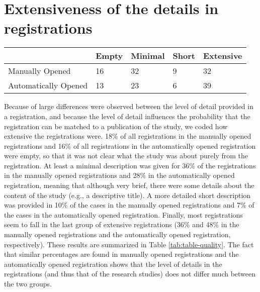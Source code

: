 \documentclass[
  ,jou, a4paper,floatsintext]{apa6}
\begin{document}
\hypertarget{extensiveness-of-the-details-in-registrations}{%
\section{Extensiveness of the details in registrations}\label{extensiveness-of-the-details-in-registrations}}

\begin{table*}[tbp]

\begin{center}
\begin{threeparttable}

\caption{\label{tab:table-quality}Classification of the extensiveness of registrations.}

\begin{tabular}{lllll}
\toprule
 & \multicolumn{1}{c}{Empty} & \multicolumn{1}{c}{Minimal} & \multicolumn{1}{c}{Short} & \multicolumn{1}{c}{Extensive}\\
\midrule
Manually Opened & 16 & 32 & 9 & 32\\
Automatically Opened & 13 & 23 & 6 & 39\\
\bottomrule
\end{tabular}

\end{threeparttable}
\end{center}

\end{table*}

Because of large differences were observed between the level of detail provided in a registration, and because the level of detail influences the probability that the registration can be matched to a publication of the study, we coded how extensive the registrations were. 18\% of all registrations in the manually opened registrations and 16\% of all registrations in the automatically opened registration were empty, so that it was not clear what the study was about purely from the registration. At least a minimal description was given for 36\% of the registrations in the manually opened registrations and 28\% in the automatically opened registration, meaning that although very brief, there were some details about the content of the study (e.g., a descriptive title). A more detailed short description was provided in 10\% of the cases in the manually opened registrations and 7\% of the cases in the automatically opened registration. Finally, most registrations seem to fall in the last group of extensive registrations (36\% and 48\% in the manually opened registrations and the automatically opened registration, respectively). These results are summarized in Table \ref{tab:table-quality}. The fact that similar percentages are found in manually opened registrations and the automatically opened registration shows that the level of details in the registrations (and thus that of the research studies) does not differ much between the two groups.
\end{document}
